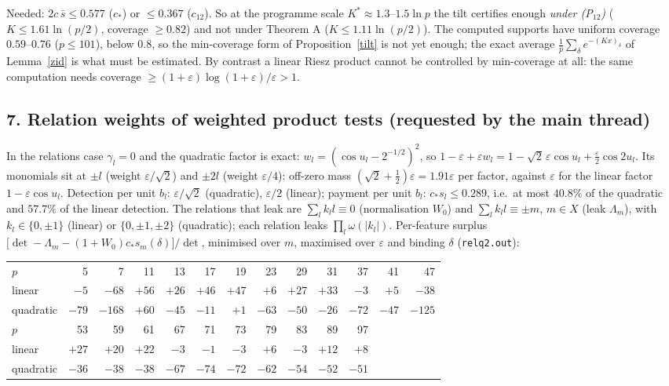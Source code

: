 \documentclass[11pt]{article}
\theoremstyle{remark}\newtheorem{remark}[theorem]{Remark}
\begin{document}
Needed: $2c\,\bar s\le0.577$ ($c_*$) or $\le0.367$ ($c_{12}$).  So at the programme scale $K^*\approx1.3$--$1.5\ln p$ the tilt certifies
enough \emph{under (P$_{12}$)} ($K\le1.61\ln(p/2)$, coverage $\ge0.82$) and not under Theorem A ($K\le1.11\ln(p/2)$).  The computed supports have
uniform coverage $0.59$--$0.76$ ($p\le101$), below $0.8$, so the min-coverage form of Proposition~\ref{tilt} is not yet enough; the exact
average $\frac1p\sum_\delta e^{-(Kx)_\delta}$ of Lemma~\ref{zid} is what must be estimated.  By contrast a linear Riesz product cannot be controlled
by min-coverage at all: the same computation needs coverage $\ge(1+\varepsilon)\log(1+\varepsilon)/\varepsilon>1$.

\subsection*{7. Relation weights of weighted product tests (requested by the main thread)}
In the relations case $\gamma_l=0$ and the quadratic factor is exact: $w_l=(\cos u_l-2^{-1/2})^2$, so
$1-\varepsilon+\varepsilon w_l=1-\sqrt2\,\varepsilon\cos u_l+\frac\varepsilon2\cos2u_l$.  Its monomials sit at $\pm l$ (weight $\varepsilon/\sqrt2$) and $\pm2l$
(weight $\varepsilon/4$): off-zero mass $(\sqrt2+\frac12)\varepsilon=1.91\varepsilon$ per factor, against $\varepsilon$ for the linear factor
$1-\varepsilon\cos u_l$.  Detection per unit $b_l$: $\varepsilon/\sqrt2$ (quadratic), $\varepsilon/2$ (linear); payment per unit $b_l$:
$c_*s_l\le0.289$, i.e.\ at most $40.8\%$ of the quadratic and $57.7\%$ of the linear detection.  The relations that leak are
$\sum_lk_ll\equiv0$ (normalisation $W_0$) and $\sum_lk_ll\equiv\pm m$, $m\in X$ (leak $\Lambda_m$), with $k_l\in\{0,\pm1\}$ (linear) or $\{0,\pm1,\pm2\}$
(quadratic); each relation leaks $\prod_l\omega(|k_l|)$.  Per-feature surplus
$\big[\det-\Lambda_m-(1+W_0)c_*s_m(\delta)\big]/\det$, minimised over $m$, maximised over $\varepsilon$ and binding $\delta$ (\texttt{relq2.out}):
\begin{center}\small\begin{tabular}{lrrrrrrrrrrrr}\toprule
$p$&5&7&11&13&17&19&23&29&31&37&41&47\\
linear&$-5$&$-68$&$+56$&$+26$&$+46$&$+47$&$+6$&$+27$&$+33$&$-3$&$+5$&$-38$\\
quadratic&$-79$&$-168$&$+60$&$-45$&$-11$&$+1$&$-63$&$-50$&$-26$&$-72$&$-47$&$-125$\\\midrule
$p$&53&59&61&67&71&73&79&83&89&97&&\\
linear&$+27$&$+20$&$+22$&$-3$&$-1$&$-3$&$+6$&$-3$&$+12$&$+8$&&\\
quadratic&$-36$&$-38$&$-38$&$-67$&$-74$&$-72$&$-62$&$-54$&$-52$&$-51$&&\\\bottomrule\end{tabular}\end{center}
\end{document}
